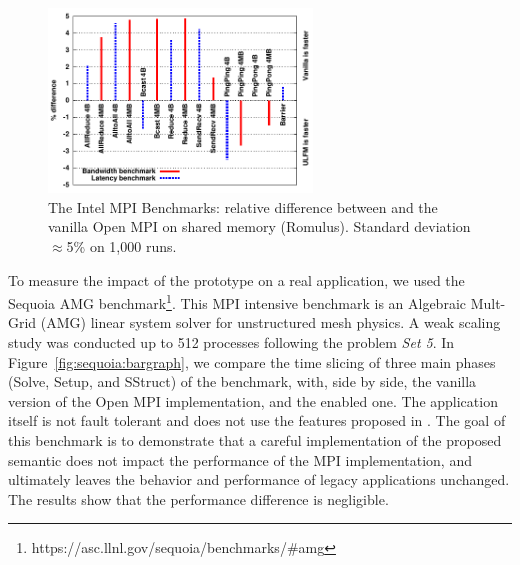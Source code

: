 \begin{figure}
\begin{center}\vspace{-.6cm}
 \includegraphics[width=7cm]{figures/IMB.pdf}\vspace{-.4cm}
 \caption{The Intel MPI Benchmarks: relative difference
   between \ulfm and the vanilla Open MPI on shared memory
  (Romulus). Standard deviation $\approx$5\% on 1,000 runs.\label{fig:IMB}}\vspace{-.6cm}
\end{center}
\end{figure}

To measure the impact of the prototype on a real application, we used the
Sequoia AMG benchmark\footnote{https://asc.llnl.gov/sequoia/benchmarks/\#amg}.
This MPI intensive benchmark is an Algebraic Mult-Grid (AMG) linear system
solver for unstructured mesh physics. A weak scaling study was conducted up to
512 processes following the problem \emph{Set 5}. In
Figure~\ref{fig:sequoia:bargraph}, we compare the time slicing of three main
phases (Solve, Setup, and SStruct) of the benchmark, with, side by side, the
vanilla version of the Open MPI implementation, and the \ulfm enabled one. The
application itself is not fault tolerant and does not use the features proposed
in \ulfm. The goal of this benchmark is to demonstrate that a careful
implementation of the proposed semantic does not impact the performance of the
MPI implementation, and ultimately leaves the behavior and performance
of legacy applications unchanged. The results show that the performance 
difference is negligible.

